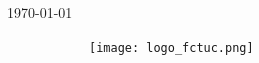 \begin{titlepage}
\dateenglish
\today\\[1.7in]


\begin{figure}[!ht]
\ \ \ \ \ \ \texttt{[image: logo\_fctuc.png]}
\end{figure}

\end{titlepage}


